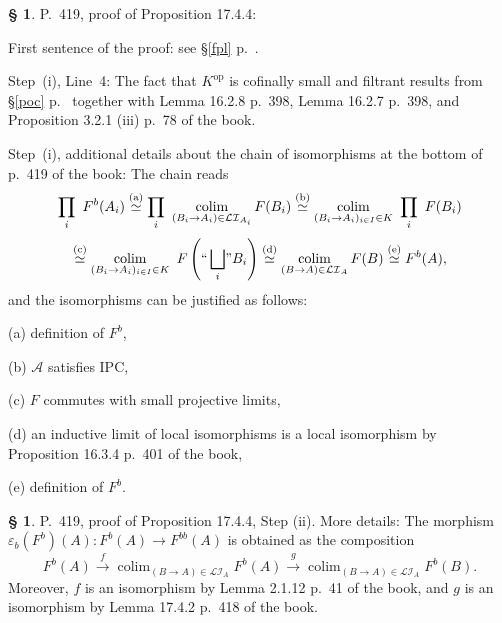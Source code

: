 \documentclass[12pt]{article}%
\theoremstyle{remark}
\theoremstyle{definition}
\newtheorem{s}[thm]{\S}%
\newcommand{\nn}{\noindent}
\newcommand{\cc}{\mathcal}
\newcommand{\A}{\mathcal A}
\newcommand{\ee}{\varepsilon}
\newcommand{\xr}{\xrightarrow}
\DeclareMathOperator*{\col}{colim}
\DeclareMathOperator{\op}{op}
\begin{document}
\begin{s}\label{1744i}
P.~419, proof of Proposition 17.4.4: 

First sentence of the proof: see \S\ref{fpl} p.~\pageref{fpl}. 

Step~(i), Line~4: The fact that $K^{\op}$ is cofinally small and filtrant results from \S\ref{poc} p.~\pageref{poc} together with Lemma 16.2.8 p.~398, Lemma 16.2.7 p.~398, and Proposition 3.2.1 (iii) p.~78 of the book. 

Step~(i), additional details about the chain of isomorphisms at the bottom of p.~419 of the book: The chain reads 
$$
\prod_i\ F^b(A_i)
\overset{(\text a)}{\simeq}\prod_i\ \col_{(B_i\to A_i)\in\cc{LI}_{A_i}}F(B_i)
\overset{(\text b)}{\simeq}\col_{(B_i\to A_i)_{i\in I}\in K}\ \prod_i\ F(B_i)
$$
$$
\overset{(\text c)}{\simeq}\col_{(B_i\to A_i)_{i\in I}\in K}\ F\left(``\bigsqcup_i\!"B_i\right)
\overset{(\text d)}{\simeq}\col_{(B\to A)\in\cc{LI}_A}F(B)
\overset{(\text e)}{\simeq}F^b(A), 
$$ 
and the isomorphisms can be justified as follows: 

\nn(a) definition of $F^b$, 

\nn(b) $\A$ satisfies IPC,

\nn(c) $F$ commutes with small projective limits, 

\nn(d) an inductive limit of local isomorphisms is a local isomorphism by Proposition 16.3.4 p.~401 of the book, 

\nn(e) definition of $F^b$. 
\end{s} 

%

\begin{s} 
P.~419, proof of Proposition 17.4.4, Step (ii). More details: The morphism $\ee_b(F^b)(A):F^b(A)\to F^{bb}(A)$ is obtained as the composition 
$$
F^b(A)\xr f\col_{(B\to A)\in\cc{LI}_A}F^b(A)\xr g\col_{(B\to A)\in\cc{LI}_A}F^b(B). 
$$ 
Moreover, $f$ is an isomorphism by Lemma 2.1.12 p.~41 of the book, and $g$ is an isomorphism by Lemma 17.4.2 p.~418 of the book.
\end{s}

%
\end{document}
